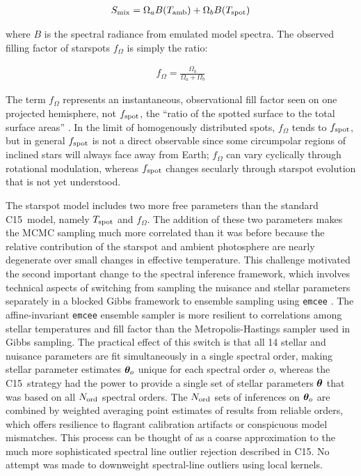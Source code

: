 \documentclass[12pt]{report}
\newcommand{\iancze}{{\sc C15}}
\begin{document}
\begin{eqnarray} \label{eqn:mix_M}
S_{\mathrm{mix}} = \Omega_a B(T_\textrm{amb})  + \Omega_b B(T_\textrm{spot})
\end{eqnarray}

where $B$ is the spectral radiance from emulated model spectra.  The observed filling factor of starspots $f_{\Omega}$ is simply the ratio:

\begin{eqnarray} \label{eqn:fill_factor}
f_{\Omega} = \frac{\Omega_b}{\Omega_a + \Omega_b}
\end{eqnarray}

The term $f_{\Omega}$ represents an instantaneous, observational fill factor seen on one projected hemisphere, not $f_{\rm spot}$, the ``ratio of the spotted surface to the total surface areas'' \citep{somers15}.  In the limit of homogenously distributed spots, $f_{\Omega}$ tends to $f_{\rm spot}$, but in general $f_{\rm spot}$ is not a direct observable since some circumpolar regions of inclined stars will always face away from Earth; $f_{\Omega}$ can vary cyclically through rotational modulation, whereas $f_{\rm spot}$ changes secularly through starspot evolution that is not yet understood.

The starspot model includes two more free parameters than the standard \iancze\ model, namely $T_\textrm{spot}$ and $f_{\Omega}$.  The addition of these two parameters makes the MCMC sampling much more correlated than it was before because the relative contribution of the starspot and ambient photosphere are nearly degenerate over small changes in effective temperature.  This challenge motivated the second important change to the spectral inference framework, which involves technical aspects of switching from sampling the nuisance and stellar parameters separately in a blocked Gibbs framework to ensemble sampling using \texttt{emcee} \citep{foreman13}.  The affine-invariant \texttt{emcee} ensemble sampler is more resilient to correlations among stellar temperatures and fill factor than the Metropolis-Hastings sampler used in Gibbs sampling.  The practical effect of this switch is that all 14 stellar and nuisance parameters are fit simultaneously in a single spectral order, making stellar parameter estimates ${\bm \theta}_{o}$ unique for each spectral order $o$, whereas the \iancze\ strategy had the power to provide a single set of stellar parameters ${\bm \theta}$ that was based on all $N_{\rm ord}$ spectral orders.  The $N_{\rm ord}$ sets of inferences on ${\bm \theta}_{o}$ are combined by weighted averaging point estimates of results from reliable orders, which offers resilience to flagrant calibration artifacts or conspicuous model mismatches.  This process can be thought of as a coarse approximation to the much more sophisticated spectral line outlier rejection described in \iancze.  No attempt was made to downweight spectral-line outliers using local kernels.
\end{document}
